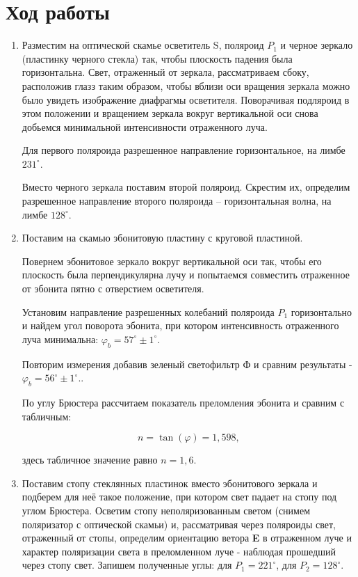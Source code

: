 \documentclass[a4paper, 12pt]{article}%
\begin{document}
\section{Ход работы}

\begin{enumerate}

\item Разместим на оптической скамье осветитель S, поляроид $P_1$ и черное зеркало (пластинку черного стекла) так, чтобы плоскость падения была горизонтальна. Свет, отраженный от зеркала, рассматриваем сбоку, расположив глазз таким образом, чтобы вблизи оси вращения зеркала можно было увидеть изображение диафрагмы осветителя. Поворачивая подляроид в этом положении и вращением зеркала вокруг вертикальной оси снова добьемся минимальной интенсивности отраженного луча.

Для первого поляроида разрешенное направление горизонтальное, на лимбе $231^{\circ}$.

Вместо черного зеркала поставим второй поляроид. Скрестим их, определим разрешенное направление второго поляроида -- горизонтальная волна, на лимбе $128^{\circ}$.

\item Поставим на скамью эбонитовую пластину с круговой пластиной.

Повернем эбонитовое зеркало вокруг вертикальной оси так, чтобы его плоскость была перпендикулярна лучу и попытаемся совместить отраженное от эбонита пятно с отверстием осветителя.

Установим направление разрешенных колебаний поляроида $P_1$ горизонтально и найдем угол поворота эбонита, при котором интенсивность отраженного луча минимальна: $\varphi_b = 57^{\circ} \pm1^{\circ}.$

Повторим измерения добавив зеленый светофильтр Ф и сравним результаты - $\varphi_b = 56^{\circ} \pm1^{\circ}.$.

По углу Брюстера рассчитаем показатель преломления эбонита и сравним с табличным:

\[n = \tan (\varphi) = 1,598,\]

здесь табличное значение равно $n = 1,6$.

\item Поставим стопу стеклянных пластинок вместо эбонитового зеркала и подберем для неё такое положение, при котором свет падает на стопу под углом Брюстера. Осветим стопу неполяризованным светом (снимем поляризатор с оптической скамьи) и, рассматривая через поляроиды свет, отраженный от стопы, определим ориентацию ветора \textbf{E} в отраженном луче и характер поляризации света в преломленном луче - наблюдая прошедший через стопу свет. Запишем полученные углы: для $P_1 = 221^{\circ}$, для $P_2 = 128^{\circ}$.


\end{enumerate}
\end{document}
